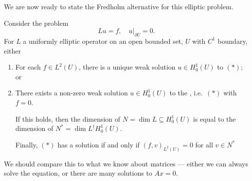 \documentclass[a4paper]{article}
\begin{document}
We are now ready to state the Fredholm alternative for this elliptic problem.
\begin{thm}
  Consider the problem
  \[
    Lu = f,\quad u|_{\partial U} = 0.\tag{$*$}
  \]
  For $L$ a uniformly elliptic operator on an open bounded set, $U$ with $C^1$ boundary, either
  \begin{enumerate}
    \item For each $f \in L^2(U)$, there is a unique weak solution $u \in H_0^1(U)$ to $(*)$; or
    \item There exists a non-zero weak solution $u \in H_0^1(U)$ to the , i.e.\ $(*)$ with $f = 0$.

      If this holds, then the dimension of $N = \dim L \subseteq H_0^1(U)$ is equal to the dimension of $N^* = \dim L^\dagger H_0^1(U)$.

      Finally, $(*)$ has a solution if and only if $(f, v)_{L^2(U)} = 0$ for all $v \in N^*$
  \end{enumerate}
\end{thm}
We should compare this to what we know about matrices --- either we can always solve the equation, or there are many solutions to $Ax = 0$.
\end{document}

